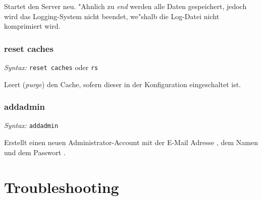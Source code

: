 Startet den Server neu. "Ahnlich zu \emph{end}
werden alle Daten gespeichert, jedoch wird
das Logging-System nicht beendet, we"shalb
die Log-Datei nicht komprimiert wird.

\subsubsection{reset caches}

\hspace*{2cm}\emph{Syntax: } \lstinline{reset caches} oder \lstinline{rs}
\vspace*{0.2cm}

Leert (\emph{purge}) den Cache, sofern dieser
in der Konfiguration eingeschaltet ist.

\subsubsection{addadmin}

\hspace*{2cm}\emph{Syntax: } \lstinline{addadmin}   
\vspace*{0.2cm}

Erstellt einen neuen Administrator-Account mit
der E-Mail Adresse , dem Namen 
und dem Passwort .


\section{Troubleshooting}


